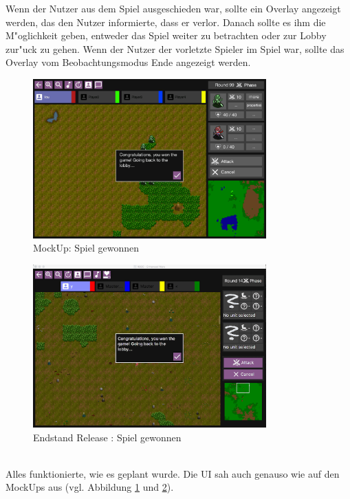 \documentclass[12pt, titlepage]{scrartcl}
\newcommand{\RN}[1]{%
	\textup{\uppercase\expandafter{\romannumeral#1}}%
}
\newcounter{subsubsubsection}[subsubsection]
\begin{document}
					Wenn der Nutzer aus dem Spiel ausgeschieden war, sollte ein Overlay angezeigt werden, das den Nutzer informierte, dass er verlor. Danach sollte es ihm die M"oglichkeit geben, entweder das Spiel weiter zu betrachten oder zur Lobby zur"uck zu gehen. Wenn der Nutzer der vorletzte Spieler im Spiel war, sollte das Overlay vom Beobachtungsmodus Ende angezeigt werden.
					\begin{figure}[H] 
						\centering
						\includegraphics[width=0.8\textwidth]{images/mockUps/GameWon.png}
						\caption{MockUp: Spiel gewonnen}
						\label{Game_Won_2}
					\end{figure}
					\begin{figure}[H] 
						\centering
						\includegraphics[width=0.8\textwidth]{images/endOfRelease/GameWon.png}
						\caption{Endstand Release \RN{3}: Spiel gewonnen}
						\label{End_Game_Won}
					\end{figure}
					\ \\ Alles funktionierte, wie es geplant wurde. Die UI sah auch genauso wie auf den MockUps aus (vgl. Abbildung \ref{Game_Won_2} und \ref{End_Game_Won}).
\end{document}
